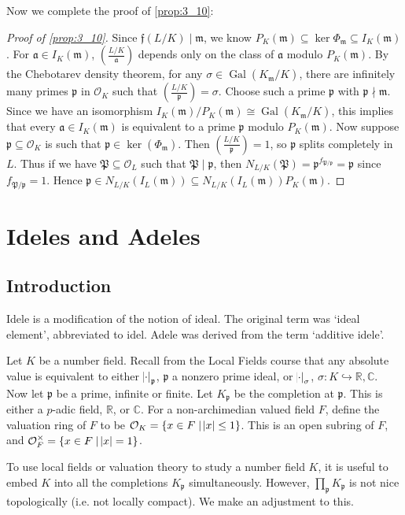 \documentclass[11pt]{article}
\theoremstyle{definition}
\theoremstyle{plain}
\theoremstyle{remark}
\DeclareMathOperator{\Gal}{Gal}
\newcommand{\RR}{\mathbb{R}}
\newcommand{\CC}{\mathbb{C}}
\newcommand{\cO}{\mathcal{O}}
\newcommand{\cp}{\mathfrak{P}}
\newcommand{\fa}{\mathfrak{a}}
\newcommand{\ff}{\mathfrak{f}}
\newcommand{\fp}{\mathfrak{p}}
\newcommand{\fm}{\mathfrak{m}}
\newcommand{\leg}[2]{\left(\frac{#1}{#2}\right)}
\begin{document}
\noindent Now we complete the proof of \autoref{prop:3_10}:
\begin{proof}[Proof of \autoref{prop:3_10}]
    Since $\ff(L/K) \mid \fm$, we know $P_K(\fm) \subseteq \ker \Phi_\fm \subseteq I_K(\fm)$. For $\fa \in I_K(\fm)$, $\leg{L/K}{\fa}$ depends only on the class of $\fa$ modulo $P_K(\fm)$. By the Chebotarev density theorem, for any $\sigma \in \Gal(K_\fm / K)$, there are infinitely many primes $\fp$ in $\cO_K$ such that $\leg{L/K}{\fp} = \sigma$. Choose such a prime $\fp$ with $\fp \nmid \fm$. Since we have an isomorphism $I_K(\fm) / P_K(\fm) \cong \Gal(K_\fm / K)$, this implies that every $\fa \in I_K(\fm)$ is equivalent to a prime $\fp$ modulo $P_K(\fm)$. Now suppose $\fp \subseteq \cO_K$ is such that $\fp \in \ker(\Phi_\fm)$. Then $\leg{L/K}{\fp} = 1$, so $\fp$ splits completely in $L$. Thus if we have $\cp \subseteq \cO_L$ such that $\cp \mid \fp$, then $N_{L/K}(\cp) = \fp^{f_{\cp/\fp}} = \fp$ since $f_{\cp/\fp} = 1$. Hence $\fp \in N_{L/K}(I_L(\fm)) \subseteq N_{L/K}(I_L(\fm)) P_K(\fm)$.
\end{proof}

\section{Ideles and Adeles}

\subsection{Introduction}

Idele is a modification of the notion of ideal. The original term was `ideal element', abbreviated to idel. Adele was derived from the term `additive idele'.

Let $K$ be a number field. Recall from the Local Fields course that any absolute value is equivalent to either $\abs{\cdot}_\fp$, $\fp$ a nonzero prime ideal, or $\abs{\cdot}_\sigma$, $\sigma : K \hookrightarrow \RR, \CC$. Now let $\fp$ be a prime, infinite or finite. Let $K_\fp$ be the completion at $\fp$. This is either a $p$-adic field, $\RR$, or $\CC$. For a non-archimedian valued field $F$, define the valuation ring of $F$ to be $\cO_K = \{x \in F \mid \abs{x} \le 1\}$. This is an open subring of $F$, and $\cO_F^\times = \{x \in F \mid \abs{x} = 1\}$.

To use local fields or valuation theory to study a number field $K$, it is useful to embed $K$ into all the completions $K_\fp$ simultaneously. However, $\prod_\fp K_\fp$ is not nice topologically (i.e. not locally compact). We make an adjustment to this.
\end{document}
